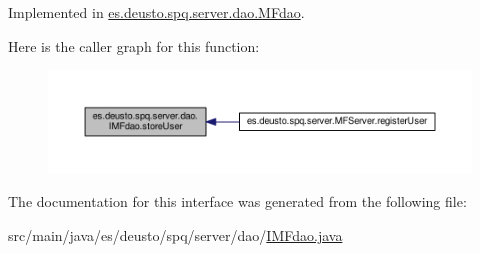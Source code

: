 Implemented in \hyperlink{classes_1_1deusto_1_1spq_1_1server_1_1dao_1_1_m_fdao_a018654ad3063099187b0005145a36ce6}{es.\+deusto.\+spq.\+server.\+dao.\+M\+Fdao}.



Here is the caller graph for this function\+:\nopagebreak
\begin{figure}[H]
\begin{center}
\leavevmode
\includegraphics[width=350pt]{interfacees_1_1deusto_1_1spq_1_1server_1_1dao_1_1_i_m_fdao_a3106afd4fe9bbf720f98c8a8c4a9f433_icgraph}
\end{center}
\end{figure}




The documentation for this interface was generated from the following file\+:\begin{DoxyCompactItemize}
\item 
src/main/java/es/deusto/spq/server/dao/\hyperlink{_i_m_fdao_8java}{I\+M\+Fdao.\+java}\end{DoxyCompactItemize}

